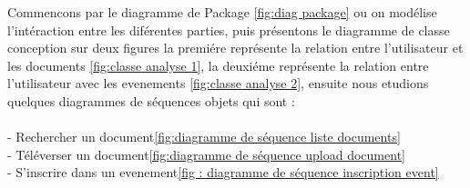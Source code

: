 \documentclass[12pt]{report}
\begin{document}
Commencons par le diagramme de Package \ref{fig:diag package} ou on modélise l'intéraction entre les diférentes parties, puis présentons le diagramme de classe conception sur deux figures la premiére représente la relation entre l'utilisateur et les documents \ref{fig:classe analyse 1}, la deuxiéme représente la relation entre l'utilisateur avec les evenements \ref{fig:classe analyse 2}, ensuite nous etudions quelques diagrammes de séquences objets qui sont :\\ \\
- Rechercher un document\ref{fig:diagramme de séquence liste documents}\\
- Téléverser un document\ref{fig:diagramme de séquence upload document}\\
- S'inscrire dans un evenement\ref{fig : diagramme de séquence inscription event}\\
\end{document}

